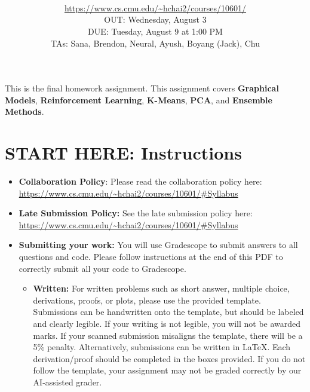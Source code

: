 \documentclass[11pt,addpoints,answers]{exam}
\title{\textsc{\hwName}
} %
\author{\courseName\\
\url{https://www.cs.cmu.edu/~hchai2/courses/10601/} \\
OUT:  Wednesday, August 3 \\
DUE:  Tuesday, August 9 at 1:00 PM \\ 
TAs: Sana, Brendon, Neural, Ayush, Boyang (Jack), Chu
}
\date{}
\date{}
\begin{document}
\maketitle

\begin{notebox}
This is the final homework assignment. This assignment covers \textbf{Graphical Models}, \textbf{Reinforcement Learning}, \textbf{K-Means}, \textbf{PCA}, and \textbf{Ensemble Methods}.
\end{notebox}
\newcommand \maxsubs {10 }
\section*{START HERE: Instructions}
\begin{itemize}

\item \textbf{Collaboration Policy}: Please read the collaboration policy here: \url{https://www.cs.cmu.edu/~hchai2/courses/10601/#Syllabus}

\item\textbf{Late Submission Policy:} See the late submission policy here: \url{https://www.cs.cmu.edu/~hchai2/courses/10601/#Syllabus}

\item\textbf{Submitting your work:} You will use Gradescope to submit
  answers to all questions and code. Please
  follow instructions at the end of this PDF to correctly submit all your code to Gradescope.

  \begin{itemize}
    

    
   \item \textbf{Written:} For written problems such as short answer, multiple choice, derivations, proofs, or plots, please use the provided template. Submissions can be handwritten onto the template, but should be labeled and clearly legible. If your writing is not legible, you will not be awarded marks. If your scanned submission misaligns the template, there will be a 5\% penalty. Alternatively, submissions can be written in LaTeX. 
   Each derivation/proof should be completed in the boxes provided. If you do not follow the template, your assignment may not be graded correctly by our AI-assisted grader.
  \end{itemize}


\end{itemize}
\end{document}
